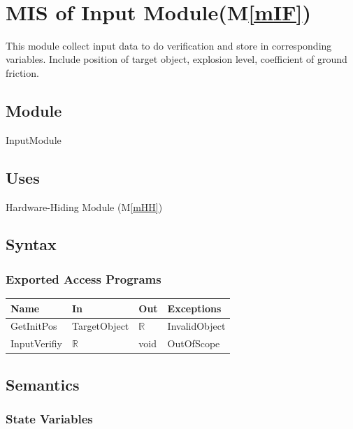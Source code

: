 \documentclass[12pt, titlepage]{article}
\newcommand{\mref}[1]{M\ref{#1}}
\begin{document}
\newpage
~\newpage

\section{MIS of Input Module(\mref{mIF})} 

This module collect input data to do verification and store in corresponding variables. Include position of target object, explosion level, coefficient of ground friction. \\

\subsection{Module}

InputModule

\subsection{Uses}

Hardware-Hiding Module (\mref{mHH})

\subsection{Syntax}



\subsubsection{Exported Access Programs}

\begin{center}
\begin{tabular}{p{2cm} p{4cm} p{4cm} p{2cm}}
\hline
\textbf{Name} & \textbf{In} & \textbf{Out} & \textbf{Exceptions} \\
\hline
GetInitPos & TargetObject & $\mathbb{R}$ & InvalidObject \\
InputVerifiy & $\mathbb{R}$ & void & OutOfScope \\
\hline
\end{tabular}
\end{center}

\subsection{Semantics}

\subsubsection{State Variables}
\end{document}

